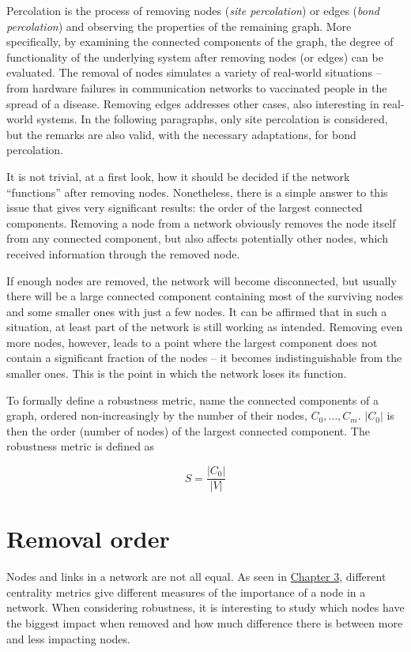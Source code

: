 \documentclass[a4paper,11pt,twoside,openright]{memoir}
\begin{document}
Percolation is the process of removing nodes (\emph{site percolation})
or edges (\emph{bond percolation}) and observing the properties of the
remaining graph. More specifically, by examining the connected
components of the graph, the degree of functionality of the underlying system 
after removing nodes (or edges) can be evaluated. The removal
of nodes simulates a variety of real-world situations -- from hardware
failures in communication networks to vaccinated people in the spread
of a disease. Removing edges addresses other cases, also interesting in
real-world systems. In the following paragraphs, only site percolation
is considered, but the remarks are also valid, with the necessary
adaptations, for bond percolation.

It is not trivial, at a first look, how it should be decided if the
network ``functions'' after removing nodes. Nonetheless, there is a
simple answer to this issue that gives very significant results: the
order of the largest connected components. Removing a node from a
network obviously removes the node itself from any connected component,
but also affects potentially other nodes, which received information
through the removed node.

If enough nodes are removed, the network will become disconnected, but
usually there will be a large connected component containing most of the
surviving nodes and some smaller ones with just a few nodes. It can be
affirmed that in such a situation, at least part of the network is still
working as intended. Removing even more nodes, however, leads to a point
where the largest component does not contain a significant fraction of
the nodes -- it becomes indistinguishable from the smaller ones. This is
the point in which the network loses its function.

To formally define a robustness metric, name the connected components of
a graph, ordered non-increasingly by the number of their nodes,
$C_0, \ldots, C_m$. $|C_0|$ is then the order (number of nodes) of the
largest connected component. The robustness metric is defined as

\begin{equation}
S = \frac{|C_0|}{|V|}
\end{equation}

\section{Removal order}\label{removal-order}

Nodes and links in a network are not all equal. As seen in
\hyperref[network-topology-and-graphs]{Chapter 3}, different
centrality metrics give different measures of the importance of a node
in a network. When considering robustness, it is interesting to study
which nodes have the biggest impact when removed and how much difference
there is between more and less impacting nodes.
\end{document}
